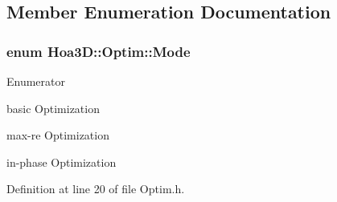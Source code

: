 \subsection{Member Enumeration Documentation}
\hypertarget{class_hoa3_d_1_1_optim_a1a153ac21e7a112279824f17981cf147}{
\subsubsection[{Mode}]{\setlength{\rightskip}{0pt plus 5cm}enum {\bf Hoa3\-D\-::\-Optim\-::\-Mode}}}\label{class_hoa3_d_1_1_optim_a1a153ac21e7a112279824f17981cf147}
\begin{Desc}
\item[Enumerator]\par
\begin{description}
\item[{\em 
\hypertarget{class_hoa3_d_1_1_optim_a1a153ac21e7a112279824f17981cf147a89acb58975922396713cc88cafc55b45}{Basic}\label{class_hoa3_d_1_1_optim_a1a153ac21e7a112279824f17981cf147a89acb58975922396713cc88cafc55b45}
}]basic Optimization \item[{\em 
\hypertarget{class_hoa3_d_1_1_optim_a1a153ac21e7a112279824f17981cf147a491a405ba48de3977668d54a8d9ff44a}{Max\-Re}\label{class_hoa3_d_1_1_optim_a1a153ac21e7a112279824f17981cf147a491a405ba48de3977668d54a8d9ff44a}
}]max-\/re Optimization \item[{\em 
\hypertarget{class_hoa3_d_1_1_optim_a1a153ac21e7a112279824f17981cf147a55da4ad4519ee8860e9ea45cc475241c}{In\-Phase}\label{class_hoa3_d_1_1_optim_a1a153ac21e7a112279824f17981cf147a55da4ad4519ee8860e9ea45cc475241c}
}]in-\/phase Optimization \end{description}
\end{Desc}


Definition at line 20 of file Optim.\-h.



